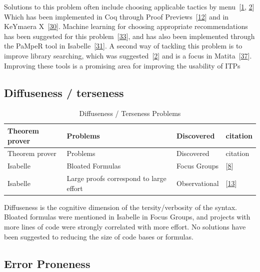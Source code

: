 \documentclass[
]{article}
\begin{document}
Solutions to this problem often include choosing applicable tactics by
menu~{[}\protect\hyperlink{ref-aitken_interactive_1998}{1},
\protect\hyperlink{ref-aitken_analysis_2000}{2}{]} Which has been
implemented in Coq through Proof
Previews~{[}\protect\hyperlink{ref-berman_development_2014}{12}{]} and
in KeYmaera X~{[}\protect\hyperlink{ref-mitsch_keymaera_2017}{30}{]}.
Machine learning for choosing appropriate recommendations has been
suggested for this
problem~{[}\protect\hyperlink{ref-ringer_replica_2020}{33}{]}, and has
also been implemented through the PaMpeR tool in
Isabelle~{[}\protect\hyperlink{ref-nagashima_pamper_2018}{31}{]}. A
second way of tackling this problem is to improve library searching,
which was
suggested~{[}\protect\hyperlink{ref-aitken_analysis_2000}{2}{]} and is a
focus in
Matita~{[}\protect\hyperlink{ref-tassi_interactive_2008}{37}{]}.
Improving these tools is a promising area for improving the usability of
ITPs

\hypertarget{diffuseness-terseness}{%
\subsection{Diffuseness / terseness}\label{diffuseness-terseness}}

\hypertarget{tbl:diffuseness}{}
\begin{longtable}[]{@{}llll@{}}
\caption{\label{tbl:diffuseness}Diffuseness / Terseness
Problems}\tabularnewline
\toprule
Theorem prover & Problems & Discovered & citation \\
\midrule
\endfirsthead
\toprule
Theorem prover & Problems & Discovered & citation \\
\midrule
\endhead
Isabelle & Bloated Formulas & Focus Groups &
{[}\protect\hyperlink{ref-beckert_usability_2015}{8}{]} \\
Isabelle & Large proofs correspond to large effort & Observational &
{[}\protect\hyperlink{ref-bourke_challenges_2012}{13}{]} \\
\bottomrule
\end{longtable}

Diffuseness is the cognitive dimension of the tersity/verbosity of the
syntax. Bloated formulas were mentioned in Isabelle in Focus Groups, and
projects with more lines of code were strongly correlated with more
effort. No solutions have been suggested to reducing the size of code
bases or formulas.

\hypertarget{error-proneness-1}{%
\subsection{Error Proneness}\label{error-proneness-1}}
\end{document}
